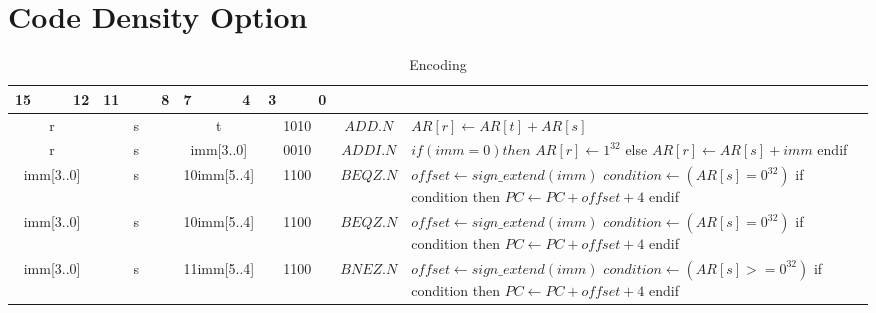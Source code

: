 \section{Code Density Option}
\setlength{\tabcolsep}{4pt}
\renewcommand{\arraystretch}{2}

\begin{longtable}{llllllllllllllll  p{1cm}  p{7cm} | }
		\caption{Encoding\label{long}}\\
		15 & & & 12 & 11 & & & 8 & 7 & & & 4 & 3 & & & 0 & & \multicolumn{1}{c}{}\\
		\hline
        \endhead
		\multicolumn{4}{|c|}{r} & \multicolumn{4}{c|}{s} & \multicolumn{4}{c|}{t} & \multicolumn{4}{c|}{1010} & \multicolumn{1}{c|}{$ADD.N$} & $AR[r] \leftarrow AR[t] + AR[s]$ \\ \hline
		\multicolumn{4}{|c|}{r} & \multicolumn{4}{c|}{s} & \multicolumn{4}{c|}{imm[3..0]} & \multicolumn{4}{c|}{0010} & \multicolumn{1}{c|}{$ADDI.N$} & $if (imm = 0) then$ \newline $AR[r] \leftarrow 1^{32}$ \newline else \newline $AR[r] \leftarrow AR[s] + imm$ \newline endif \\ \hline
		\multicolumn{4}{|c|}{imm[3..0]} & \multicolumn{4}{c|}{s} & \multicolumn{4}{c|}{10imm[5..4]} & \multicolumn{4}{c|}{1100} & \multicolumn{1}{c|}{$BEQZ.N$} & $offset \leftarrow sign\_extend(imm)$ \newline $condition \leftarrow (AR[s] = 0^{32})$ \newline if condition then \newline $PC \leftarrow PC + offset + 4$ \newline endif \\ \hline
		\multicolumn{4}{|c|}{imm[3..0]} & \multicolumn{4}{c|}{s} & \multicolumn{4}{c|}{10imm[5..4]} & \multicolumn{4}{c|}{1100} & \multicolumn{1}{c|}{$BEQZ.N$} & $offset \leftarrow sign\_extend(imm)$ \newline $condition \leftarrow (AR[s] = 0^{32})$ \newline if condition then \newline $PC \leftarrow PC + offset + 4$ \newline endif \\ \hline
		\multicolumn{4}{|c|}{imm[3..0]} & \multicolumn{4}{c|}{s} & \multicolumn{4}{c|}{11imm[5..4]} & \multicolumn{4}{c|}{1100} & \multicolumn{1}{c|}{$BNEZ.N$} & $offset \leftarrow sign\_extend(imm)$ \newline $condition \leftarrow (AR[s] >= 0^{32})$ \newline if condition then \newline $PC \leftarrow PC + offset + 4$ \newline endif \\ \hline

\end{longtable}
